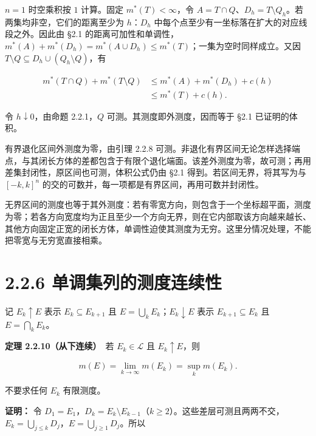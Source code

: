 \documentclass[11pt,a4paper]{article}
\begin{document}
\(n=1\) 时空乘积按 \(1\) 计算。固定 \(m^*(T)<\infty\)，令
\(A=T\cap Q\)、\(D_h=T\setminus Q_h\)。若两集均非空，它们的距离至少为
\(h\)：\(D_h\) 中每个点至少有一坐标落在扩大的对应线段之外。因此由 §2.1
的距离可加性和单调性，
\(m^*(A)+m^*(D_h)=m^*(A\cup D_h)\le m^*(T)\)；一集为空时同样成立。又因
\(T\setminus Q\subseteq D_h\cup(Q_h\setminus Q)\)，有

\begin{equation*}
\begin{aligned}
m^*(T\cap Q)+m^*(T\setminus Q)
&\le m^*(A)+m^*(D_h)+c(h)\\
&\le m^*(T)+c(h).
\end{aligned}
\tag{2.2.13}
\end{equation*}

令 \(h\downarrow0\)，由命题 2.2.1，\(Q\) 可测。其测度即外测度，因而等于
§2.1 已证明的体积。

有界退化区间外测度为零，由引理 2.2.8
可测。非退化有界区间无论怎样选择端点，与其闭长方体的差都包含于有限个退化端面。该差外测度为零，故可测；再用差集封闭性，原区间也可测，体积公式仍由
§2.1 得到。若区间无界，将其写为与 \([-k,k]^n\)
的交的可数并，每一项都是有界区间，再用可数并封闭性。

无界区间的测度也等于其外测度：若有零宽方向，则包含于一个坐标超平面，测度为零；若各方向宽度均为正且至少一个方向无界，则在它内部取该方向越来越长、其他方向固定正宽的闭长方体，单调性迫使其测度为无穷。这里分情况处理，不能把零宽与无穷宽直接相乘。

\section[\S{}2.2.6
单调集列的测度连续性]{2.2.6
单调集列的测度连续性}\label{ux5355ux8c03ux96c6ux5217ux7684ux6d4bux5ea6ux8fdeux7eedux6027}

记 \(E_k\uparrow E\) 表示 \(E_k\subseteq E_{k+1}\) 且
\(E=\bigcup_kE_k\)；\(E_k\downarrow E\) 表示 \(E_{k+1}\subseteq E_k\) 且
\(E=\bigcap_kE_k\)。

\textbf{定理 2.2.10（从下连续）}　若 \(E_k\in\mathcal L\) 且
\(E_k\uparrow E\)，则

\begin{equation*}
m(E)=\lim_{k\to\infty}m(E_k)=\sup_km(E_k).
\tag{2.2.14}
\end{equation*}

不要求任何 \(E_k\) 有限测度。

\textbf{证明：} 令
\(D_1=E_1\)，\(D_k=E_k\setminus E_{k-1}\)（\(k\ge2\)）。这些差层可测且两两不交，\(E_k=\bigcup_{j\le k}D_j\)，\(E=\bigcup_{j\ge1}D_j\)。所以
\end{document}
